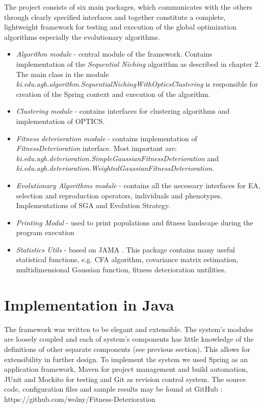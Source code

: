 The project consists of six main packages, which communicates with the
others through clearly specified interfaces and together constitute a
complete, lightweight framework for testing and execution of the global 
optimization algorithms especially the evolutionary algorithms.
\begin{itemize}
  \item \textit{Algorithm module} - central module of the framework. Contains
  implementation of the \textit{Sequential Niching} algorithm as described in
  chapter 2. The main class in the module
  \textit{ki.edu.agh.algorithm.SequentialNichingWithOpticsClustering} is
  responsible for creation of the Spring context and execution of the algorithm. 
  \item \textit{Clustering module} - contains interfaces for clustering
  algorithms and implementation of OPTICS.
  \item \textit{Fitness deterioration module} - contains implementation of
  \textit{FitnessDeterioration} interface. Most important are:
  \textit{ki.edu.agh.deterioration.SimpleGaussianFitnessDeterioration} and 
  \textit{ki.edu.agh.deterioration.WeightedGaussianFitnessDeterioration}.
  \item \textit{Evolutionary Algorithms module} - contains all the necessary
  interfaces for EA, selection and reproduction operators, individuals and
  phenotypes. Implementations of SGA and Evolution Strategy. 
  \item \textit{Printing Modul} - used to print populations and fitness
  landscape during the program execution
  \item \textit{Statistics Utils} - based on JAMA \cite{jama}. This package
  contains many useful statistical functions, e.g. CFA algorithm, covariance
  matrix estimation, multidimensional Gaussian function, fitness deterioration
  untilities.
\end{itemize}

\section{Implementation in Java}
The framework was written to be elegant and extensible. The system's 
modules are loosely coupled and each of system's components has little knowledge of the definitions 
of other separate components (see previous section). This allows for
extensibility in further design. To implement the system we used Spring
\cite{spring} as an application framework, Maven \cite{maven} for project
management and build automation, JUnit \cite{junit} and Mockito \cite{mockito}
for testing and Git \cite{git} as revision control system. 
The source code, configuration files and sample results may be found at 
GitHub \cite{github}: https://github.com/wolny/Fitness-Deterioration

